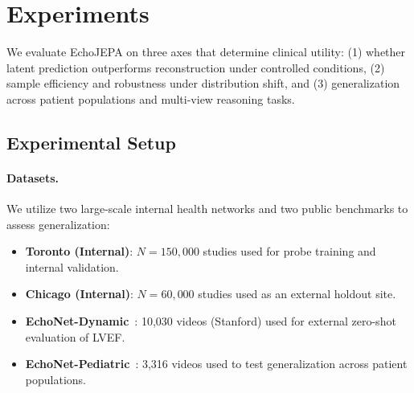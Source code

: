 \documentclass{article}
\theoremstyle{plain}
\theoremstyle{definition}
\theoremstyle{remark}
\begin{document}
\section{Experiments}
\label{sec:experiments}

We evaluate EchoJEPA on three axes that determine clinical utility: (1) whether latent prediction outperforms reconstruction under controlled conditions, (2) sample efficiency and robustness under distribution shift, and (3) generalization across patient populations and multi-view reasoning tasks.

\subsection{Experimental Setup}
\label{sec:exp:setup}

\paragraph{Datasets.}
We utilize two large-scale internal health networks and two public benchmarks to assess generalization:
\begin{itemize}[leftmargin=*, nosep, topsep=0pt]

\item \textbf{Toronto (Internal)}: $N{=}150,000$ studies used for probe training and internal validation.

\item \textbf{Chicago (Internal)}: $N{=}60,000$ studies used as an external holdout site.

\item \textbf{EchoNet-Dynamic}~\citep{echonet}: 10,030 videos (Stanford) used for external zero-shot evaluation of LVEF.

\item \textbf{EchoNet-Pediatric}~\citep{echonet_pediatric}: 3,316 videos used to test generalization across patient populations.

\end{itemize}
\end{document}
